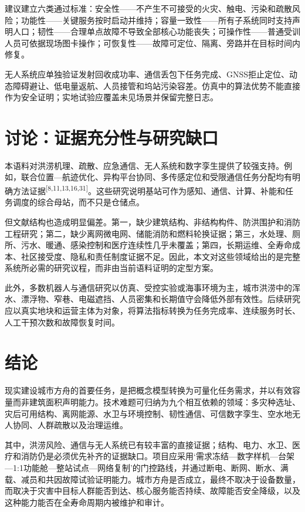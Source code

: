 \documentclass[UTF8,a4paper,zihao=-4]{ctexart}
\begin{document}
建议建立六类通过标准：安全性——不产生不可接受的火灾、触电、污染和疏散风险；功能性——关键服务按时启动并维持；容量一致性——所有子系统同时支持声明人口；韧性——合理单点故障不导致全部核心功能丧失；可操作性——普通受训人员可依据现场图卡操作；可恢复性——故障可定位、隔离、旁路并在目标时间内修复。

无人系统应单独验证发射回收成功率、通信丢包下任务完成、GNSS拒止定位、动态障碍避让、低电量返航、人员接管和坞站污染容差。仿真中的算法优势不能直接作为安全证明；实地试验应覆盖未见场景并保留完整日志。

\section{讨论：证据充分性与研究缺口}

本语料对洪涝机理、疏散、应急通信、无人系统和数字孪生提供了较强支持。例如，联合位置—航迹优化、异构平台协同、多传感定位和受限通信任务分配均有明确方法证据\textsuperscript{[8,11,13,16,31]}。这些研究说明基站可作为感知、通信、计算、补能和任务调度的综合母站，而不只是仓储点。

但文献结构也造成明显偏差。第一，缺少建筑结构、非结构构件、防洪围护和消防工程研究；第二，缺少离网微电网、储能消防和燃料轮换证据；第三，水处理、厕所、污水、暖通、感染控制和医疗连续性几乎未覆盖；第四，长期运维、全寿命成本、社区接受度、隐私和责任制度证据不足。因此，本文对这些领域给出的是完整系统所必需的研究议程，而非由当前语料证明的定型方案。

此外，多数机器人与通信研究以仿真、受控实验或海事环境为主，城市洪涝中的浑水、漂浮物、窄巷、电磁遮挡、人员密集和长期值守会降低外部有效性。后续研究应以真实地块和运营主体为对象，将算法指标转换为任务完成率、连续服务时长、人工干预次数和故障恢复时间。

\section{结论}

现实建设城市方舟的首要任务，是把概念模型转换为可量化任务需求，并以有效容量而非建筑面积声明能力。技术难题可归纳为九个相互依赖的领域：多灾种选址、灾后可用结构、离网能源、水卫与环境控制、韧性通信、可信数字孪生、空水地无人协同、人群疏散以及治理运维。

其中，洪涝风险、通信与无人系统已有较丰富的直接证据；结构、电力、水卫、医疗和消防仍是必须优先补齐的证据缺口。项目应采用‘需求冻结—数字样机—台架—1:1功能舱—整站试点—网络复制’的门控路线，并通过断电、断网、断水、满载、减员和共因故障试验证明能力。城市方舟是否成立，最终不取决于设备数量，而取决于灾害中目标人群能否到达、核心服务能否持续、故障能否安全降级，以及这种能力能否在全寿命周期内被维护和审计。
\end{document}

